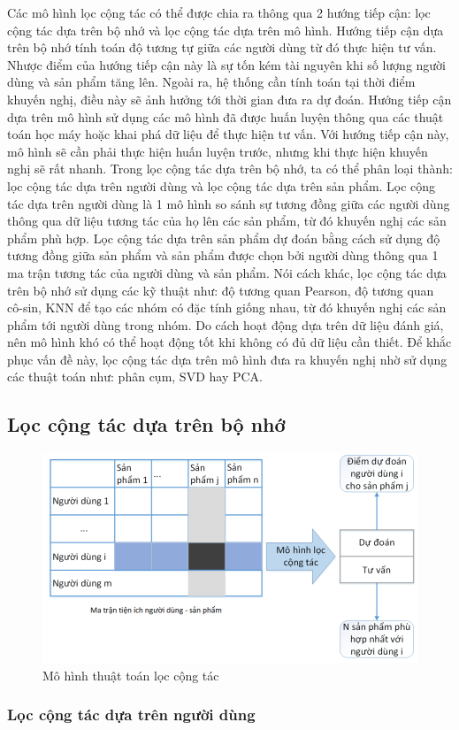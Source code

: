 Các mô hình lọc cộng tác có thể được chia ra thông qua 2 hướng tiếp cận: lọc cộng tác dựa trên bộ nhớ và 
lọc cộng tác dựa trên mô hình. Hướng tiếp cận dựa trên bộ nhớ tính toán độ
tương tự giữa các người dùng từ đó thực hiện tư vấn. Nhược điểm của hướng tiếp
cận này là sự tốn kém tài nguyên khi số lượng người dùng và sản phẩm tăng lên. Ngoài ra, hệ 
thống cần tính toán tại thời điểm khuyến nghị, điều này sẽ ảnh hưởng tới thời gian đưa ra dự đoán.
Hướng tiếp cận dựa trên mô hình sử dụng các mô hình đã được huấn luyện thông
qua các thuật toán học máy hoặc khai phá dữ liệu để thực hiện tư vấn. Với hướng tiếp cận này, 
mô hình sẽ cần phải thực hiện huấn luyện trước, nhưng khi thực hiện khuyến nghị sẽ rất nhanh. 
Trong lọc cộng tác dựa trên bộ nhớ, ta có thể phân loại thành: 
lọc cộng tác dựa trên người dùng và lọc cộng tác dựa trên sản phẩm. Lọc cộng tác dựa trên người dùng là 
1 mô hình so sánh sự tương đồng giữa các người dùng thông qua dữ liệu tương tác của họ lên 
các sản phẩm, từ đó khuyến nghị các sản phẩm phù hợp. Lọc cộng tác dựa trên sản phẩm dự 
đoán bằng cách sử dụng độ tương đồng giữa sản phẩm và sản phẩm được chọn bởi người dùng 
thông qua 1 ma trận tương tác của người dùng và sản phẩm. Nói cách khác, lọc cộng tác dựa 
trên bộ nhớ sử dụng các kỹ thuật như: độ tương quan Pearson, độ tương quan cô-sin, KNN 
để tạo các nhóm có đặc tính giống nhau, từ đó khuyến nghị các sản phẩm tới người dùng trong 
nhóm. Do cách hoạt động dựa trên dữ liệu đánh giá, nên mô hình khó có thể hoạt động tốt 
khi không có đủ dữ liệu cần thiết. Để khắc phục vấn đề này, lọc cộng tác dựa trên mô hình 
đưa ra khuyến nghị nhờ sử dụng các thuật toán như: phân cụm, SVD hay PCA.

\subsection{Lọc cộng tác dựa trên bộ nhớ}

\begin{figure}[htbp]
    \centering
    \includegraphics[width=1\textwidth]{imgs/chapter_2/loc-cong-tac.png}
    \caption{Mô hình thuật toán lọc cộng tác}
    \label{lct}
\end{figure}

\subsubsection{Lọc cộng tác dựa trên người dùng}